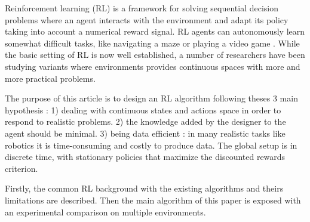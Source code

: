Reinforcement learning (RL) \cite{Sutton1998} is a framework for solving sequential decision
problems where an agent interacts with the environment and adapt its policy
taking into account a numerical reward signal. RL agents can autonomously
learn somewhat difficult tasks, like navigating a maze or playing a video game \cite{Tesauro1994}.
While the basic setting of RL is now well established, a number of researchers have been
studying variants where environments provides continuous spaces with more and more practical problems.

The purpose of this article is to design an RL algorithm following theses 3 main hypothesis :
1) dealing with continuous states and actions space in order to respond to realistic problems.
2) the knowledge added by the designer to the agent should be minimal.
3) being data efficient : in many realistic tasks like robotics it is time-consuming and costly to produce data.
The global setup is in discrete time, with stationary policies that maximize the
discounted rewards criterion.



Firstly, the common RL background with the existing algorithms and theirs limitations are described.
Then the main algorithm of this paper is exposed with an experimental comparison on multiple environments.
